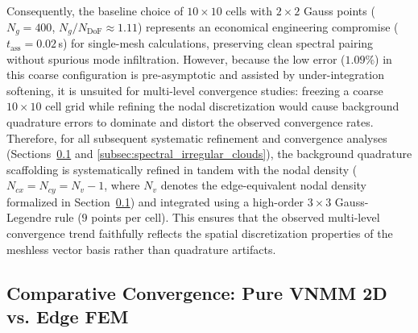 \documentclass[preprint,12pt]{elsarticle}
\begin{document}
Consequently, the baseline choice of $10 \times 10$ cells with $2 \times 2$ Gauss points ($N_g = 400$, $N_g / N_{\mathrm{DoF}} \approx 1.11$) represents an economical engineering compromise ($t_{\mathrm{ass}} = 0.02$\,s) for single-mesh calculations, preserving clean spectral pairing without spurious mode infiltration. However, because the low error ($1.09\%$) in this coarse configuration is pre-asymptotic and assisted by under-integration softening, it is unsuited for multi-level convergence studies: freezing a coarse $10 \times 10$ cell grid while refining the nodal discretization would cause background quadrature errors to dominate and distort the observed convergence rates. Therefore, for all subsequent systematic refinement and convergence analyses (Sections~\ref{subsec:convergence_comparison} and \ref{subsec:spectral_irregular_clouds}), the background quadrature scaffolding is systematically refined in tandem with the nodal density ($N_{cx} = N_{cy} = N_v - 1$, where $N_v$ denotes the edge-equivalent nodal density formalized in Section~\ref{subsec:convergence_comparison}) and integrated using a high-order $3 \times 3$ Gauss-Legendre rule ($9$ points per cell). This ensures that the observed multi-level convergence trend faithfully reflects the spatial discretization properties of the meshless vector basis rather than quadrature artifacts.

\subsection{Comparative Convergence: Pure VNMM 2D vs. Edge FEM}
\label{subsec:convergence_comparison}
\end{document}
